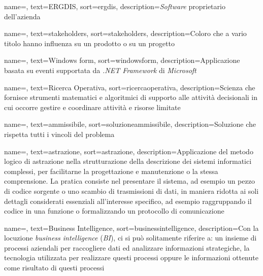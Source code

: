 {
    name=,
    text=ERGDIS,
    sort=ergdis,
    description={\textit{Software} proprietario dell'azienda \textit{\myCompany}}
}

{
    name=,
    text=stakeholders,
    sort=stakeholders,
    description={Coloro che a vario titolo hanno influenza su un
    prodotto o su un progetto}
}

{
    name=,
    text=Windows form,
    sort=windowsform,
    description={Applicazione basata su eventi
    supportata da \textit{.NET Framework} di \textit{Microsoft} \cite{siteE:wiki}}
}

{
    name=,
    text=Ricerca Operativa,
    sort=ricercaoperativa,
    description={Scienza che fornisce strumenti matematici e algoritmici di
    supporto alle attività decisionali in cui occorre gestire
    e coordinare attività e risorse limitate \cite{siteE:wiki}}
}

{
    name=,
    text=ammissibile,
    sort=soluzioneammissibile,
    description={Soluzione che rispetta tutti i vincoli del problema}
}

{
    name=,
    text=astrazione,
    sort=astrazione,
    description={Applicazione del metodo logico di astrazione nella strutturazione della
    descrizione dei sistemi informatici complessi, per facilitarne la progettazione e
    manutenzione o la stessa comprensione. La pratica consiste nel presentare il
    sistema, ad esempio un pezzo di codice sorgente o uno scambio di trasmissioni di
    dati, in maniera ridotta ai soli dettagli considerati essenziali all’interesse specifico,
    ad esempio raggruppando il codice in una funzione o formalizzando un protocollo
    di comunicazione \cite{siteE:wiki}}
}

{
    name=,
    text=Business Intelligence,
    sort=businessintelligence,
    description={Con la locuzione \textit{business intelligence}
    (\textit{BI}), ci si può solitamente riferire a: un insieme di processi aziendali per raccogliere dati ed analizzare
    informazioni strategiche, la tecnologia utilizzata per realizzare questi processi
    oppure le informazioni ottenute come risultato di questi processi \cite{siteE:wiki}}
}

